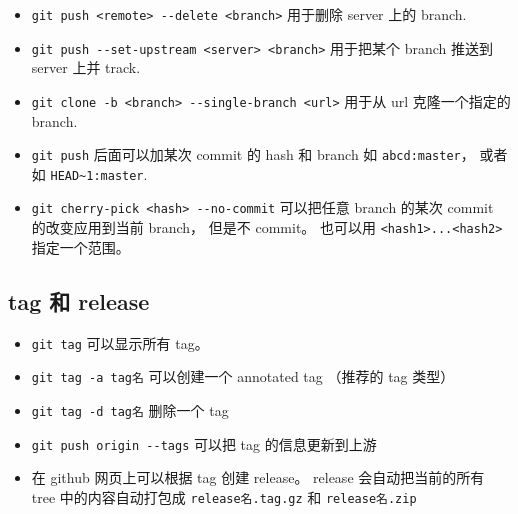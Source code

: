 \begin{itemize}
\item \verb|git push <remote> --delete <branch>| 用于删除 server 上的 branch.
\item \verb|git push --set-upstream <server> <branch>| 用于把某个 branch 推送到 server 上并 track.


\item \verb|git clone -b <branch> --single-branch <url>| 用于从 url 克隆一个指定的 branch.
\item \verb|git push| 后面可以加某次 commit 的 hash 和 branch 如 \verb|abcd:master|， 或者如 \verb|HEAD~1:master|.

\item \verb|git cherry-pick <hash> --no-commit| 可以把任意 branch 的某次 commit 的改变应用到当前 branch， 但是不 commit。 也可以用 \verb|<hash1>...<hash2>| 指定一个范围。
\end{itemize}

\subsection{tag 和 release}
\begin{itemize}
\item \verb|git tag| 可以显示所有 tag。
\item \verb|git tag -a tag名| 可以创建一个 annotated tag （推荐的 tag 类型）
\item \verb|git tag -d tag名| 删除一个 tag
\item \verb|git push origin --tags| 可以把 tag 的信息更新到上游
\item 在 github 网页上可以根据 tag 创建 release。 release 会自动把当前的所有 tree 中的内容自动打包成 \verb|release名.tag.gz| 和 \verb|release名.zip|
\end{itemize}
